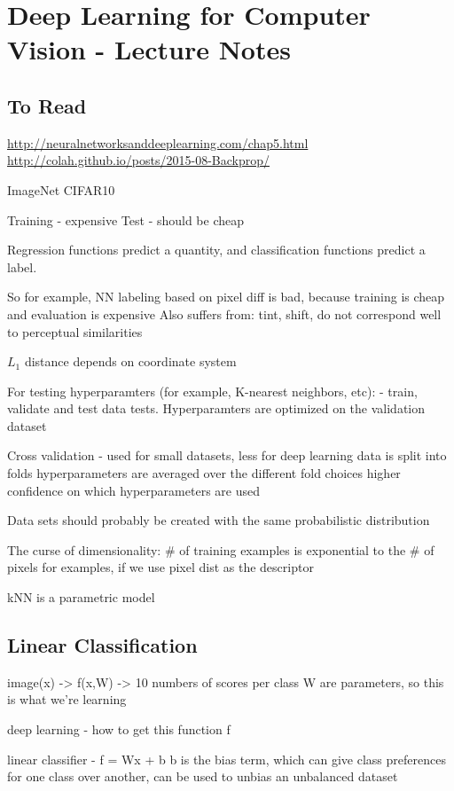\section{Deep Learning for Computer Vision - Lecture Notes}

\subsection{To Read}

\url{http://neuralnetworksanddeeplearning.com/chap5.html}
\url{http://colah.github.io/posts/2015-08-Backprop/}

ImageNet
CIFAR10

Training - expensive
Test - should be cheap 

Regression functions predict a quantity, and classification functions predict a label.

So for example, NN labeling based on pixel diff is bad, because training is cheap and evaluation is expensive
Also suffers from: tint, shift, do not correspond well to perceptual similarities

$L_1$ distance depends on coordinate system 

For testing hyperparamters (for example, K-nearest neighbors, etc):
- train, validate and test data tests. Hyperparamters are optimized on the validation dataset

Cross validation - 
used for small datasets, less for deep learning
data is split into folds
hyperparameters are averaged over the different fold choices
higher confidence on which hyperparameters are used

Data sets should probably be created with the same probabilistic distribution

The curse of dimensionality:
\# of training examples is exponential to the \# of pixels for examples, if we use pixel dist as the descriptor

kNN is a parametric model

\subsection{Linear Classification}

image(x) -> f(x,W) -> 10 numbers of scores per class
W are parameters, so this is what we're learning

deep learning - how to get this function f

linear classifier - f = Wx + b 
b is the bias term, which can give class preferences for one class over another, can be used to unbias an unbalanced dataset

